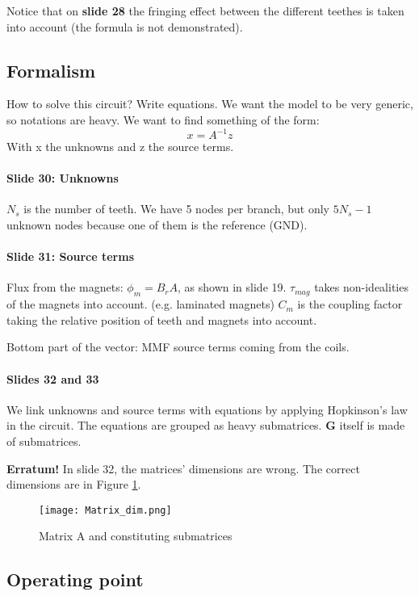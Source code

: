 Notice that on \textbf{slide 28} the fringing effect between the different teethes is taken into account (the formula is not demonstrated).


\subsection{Formalism}

How to solve this circuit? Write equations.
We want the model to be very generic, so notations are heavy.
We want to find something of the form:
$$x=A^{-1}z$$
With x the unknowns and z the source terms.
\paragraph{Slide 30: Unknowns}
$N_s$ is the number of teeth. We have 5 nodes per branch, but only $5 N_s-1$ unknown nodes because one of them is the reference (GND).

\paragraph{Slide 31: Source terms}
Flux from the magnets: $\phi_m = B_r A$, as shown in slide 19.
$\tau_{mag}$ takes non-idealities of the magnets into account. (e.g. laminated magnets)
$C_m$ is the coupling factor taking the relative position of teeth and magnets into account.

Bottom part of the vector: MMF source terms coming from the coils.

\paragraph{Slides 32 and 33}
We link unknowns and source terms with equations by applying Hopkinson's law in the circuit.
The equations are grouped as heavy submatrices.
\textbf{G} itself is made of submatrices.

\textbf{Erratum!} In slide 32, the matrices' dimensions are wrong. The correct dimensions are in Figure \ref{fig:matrix}.

\begin{figure}[H]
    \centering
    \texttt{[image: Matrix\_dim.png]}
    \caption{Matrix A and constituting submatrices}
    \label{fig:matrix}
\end{figure}

\subsection{Operating point}

